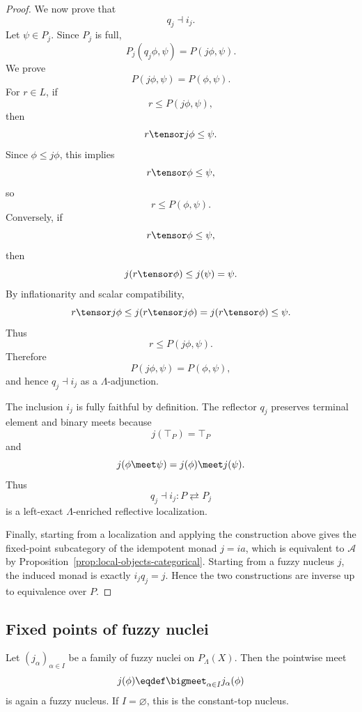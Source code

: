 \begin{proof}
We now prove that
\[
    q_j\dashv i_j.
\]
Let \(\psi\in P_j\). Since \(P_j\) is full,
\[
    P_j(q_j\phi,\psi)=P(j\phi,\psi).
\]
We prove
\[
    P(j\phi,\psi)=P(\phi,\psi).
\]
For \(r\in L\), if
\[
    r\leq P(j\phi,\psi),
\]
then
\[
    r\tensor j\phi\leq\psi.
\]
Since \(\phi\leq j\phi\), this implies
\[
    r\tensor\phi\leq\psi,
\]
so
\[
    r\leq P(\phi,\psi).
\]
Conversely, if
\[
    r\tensor\phi\leq\psi,
\]
then
\[
    j(r\tensor\phi)\leq j(\psi)=\psi.
\]
By inflationarity and scalar compatibility,
\[
    r\tensor j\phi
    \leq
    j(r\tensor j\phi)
    =
    j(r\tensor\phi)
    \leq
    \psi.
\]
Thus
\[
    r\leq P(j\phi,\psi).
\]
Therefore
\[
    P(j\phi,\psi)=P(\phi,\psi),
\]
and hence \(q_j\dashv i_j\) as a \(\Lambda\)-adjunction.

The inclusion \(i_j\) is fully faithful by definition. The reflector \(q_j\) preserves
terminal element and binary meets because
\[
    j(\top_P)=\top_P
\]
and
\[
    j(\phi\meet\psi)=j(\phi)\meet j(\psi).
\]
Thus
\[
    q_j\dashv i_j:
    P\rightleftarrows P_j
\]
is a left-exact \(\Lambda\)-enriched reflective localization.

Finally, starting from a localization and applying the construction above gives the
fixed-point subcategory of the idempotent monad \(j=ia\), which is equivalent to
\(\mathcal A\) by Proposition~\ref{prop:local-objects-categorical}. Starting from a
fuzzy nucleus \(j\), the induced monad is exactly \(i_jq_j=j\). Hence the two
constructions are inverse up to equivalence over \(P\).
\end{proof}

\subsection{Fixed points of fuzzy nuclei}
\label{subsec:fixed-points-fuzzy-nuclei}

\begin{lemma}
\label{lem:intersections-fuzzy-nuclei}
Let \((j_\alpha)_{\alpha\in I}\) be a family of fuzzy nuclei on \(P_\Lambda(X)\).
Then the pointwise meet
\[
    j(\phi)\eqdef\bigmeet_{\alpha\in I}j_\alpha(\phi)
\]
is again a fuzzy nucleus. If \(I=\varnothing\), this is the constant-top nucleus.
\end{lemma}

